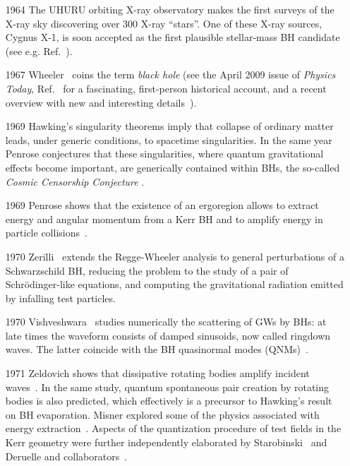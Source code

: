 \documentclass[11pt]{article}
\numberwithin{equation}{section} %
\begin{document}
\begin{itemize}[noitemsep]
\item[1964] The UHURU orbiting X-ray observatory makes the
first surveys of the X-ray sky discovering over 300 X-ray ``stars''.
One of these X-ray sources, Cygnus X-1, is soon accepted as the first plausible
stellar-mass BH candidate (see e.g. Ref.~\cite{Bolton:1972}).

\item[1967] Wheeler~\cite{Ruffini:1971,wheeler} coins the term
\textit{black hole} (see the April 2009 issue of {\em Physics Today},
Ref.~\cite{Wheeler:1998vs} for a fascinating, first-person historical
account, and a recent overview with new and interesting details~\cite{Herdeiro:2018ldf}).

\item[1969] Hawking's singularity theorems imply that collapse
of ordinary matter leads, under generic conditions, to spacetime singularities.
In the same year Penrose conjectures that these singularities, where quantum gravitational effects
become important, are generically contained within BHs, the so-called \textit{Cosmic Censorship Conjecture} 
\cite{Penrose:1969,Wald:1997wa}.

 \item[1969] Penrose shows that the existence of an ergoregion allows to extract energy and angular momentum from a Kerr BH and to amplify energy in particle collisions~\cite{Penrose:1969}.
 
 \item[1970] Zerilli~\cite{Zerilli:1970se,Zerilli:1971wd}
extends the Regge-Wheeler analysis to general perturbations of a Schwarzschild
BH, reducing the problem to the study of a pair of
Schr\"odinger-like equations, and computing the
gravitational radiation emitted by infalling test particles.

 \item[1970] Vishveshwara~\cite{vish} studies numerically the
scattering of GWs by BHs: at late times the
waveform consists of damped sinusoids, now called ringdown waves. The latter coincide with the BH quasinormal modes (QNMs)~\cite{Nollert:1999ji,Kokkotas:1999bd,Ferrari:2007dd,Berti:2009kk,Konoplya:2011qq}.

 \item[1971] Zeldovich shows that dissipative rotating bodies amplify
incident waves~\cite{zeldovich1,zeldovich2}. In the same study, quantum spontaneous
pair creation by rotating bodies is also predicted, which effectively is a precursor to
Hawking's result on BH evaporation. Misner explored some of the physics associated with energy extraction~\cite{Misner:1972kx}. Aspects of the quantization procedure of test fields in the Kerr geometry
were further independently elaborated by Starobinski~\cite{Starobinski:1973,Starobinski2:1973} and Deruelle and collaborators~\cite{Deruelle:1974zy,Deruelle:1975yz}.


\end{itemize}
\end{document}
